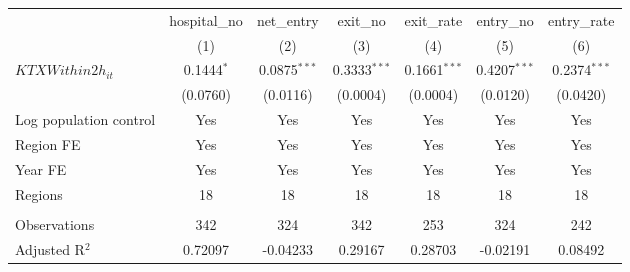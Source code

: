 \begingroup
\centering
\begin{tabular}{lcccccc}
   \toprule
                          & hospital\_no  & net\_entry     & exit\_no       & exit\_rate     & entry\_no      & entry\_rate \\    
                          & (1)           & (2)            & (3)            & (4)            & (5)            & (6)\\  
   \midrule 
   $KTXWithin2h_{it}$     & 0.1444$^{*}$  & 0.0875$^{***}$ & 0.3333$^{***}$ & 0.1661$^{***}$ & 0.4207$^{***}$ & 0.2374$^{***}$\\   
                          & (0.0760)      & (0.0116)       & (0.0004)       & (0.0004)       & (0.0120)       & (0.0420)\\   
   Log population control & Yes           & Yes            & Yes            & Yes            & Yes            & Yes\\  
   Region FE              & Yes           & Yes            & Yes            & Yes            & Yes            & Yes\\  
   Year FE                & Yes           & Yes            & Yes            & Yes            & Yes            & Yes\\  
   Regions                & 18            & 18             & 18             & 18             & 18             & 18\\  
    \\
   Observations           & 342           & 324            & 342            & 253            & 324            & 242\\  
   Adjusted R$^2$         & 0.72097       & -0.04233       & 0.29167        & 0.28703        & -0.02191       & 0.08492\\  
   \bottomrule
\end{tabular}
\par\endgroup
